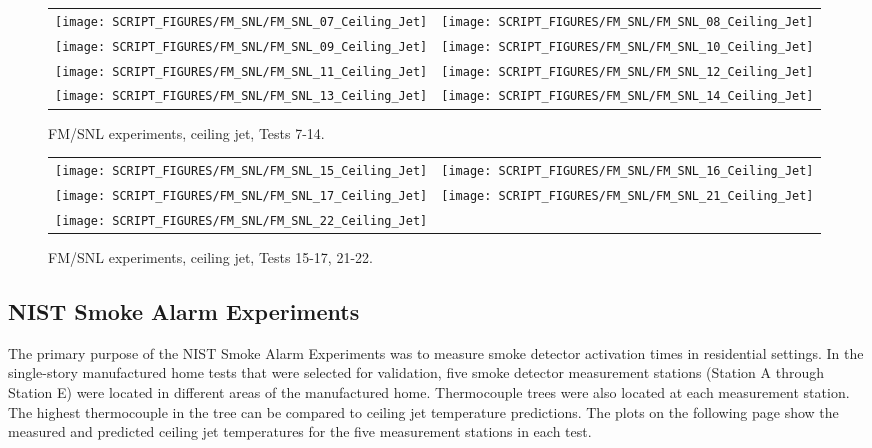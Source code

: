 \newpage

\begin{figure}[p]
\begin{tabular*}{\textwidth}{l@{\extracolsep{\fill}}r}
\texttt{[image: SCRIPT\_FIGURES/FM\_SNL/FM\_SNL\_07\_Ceiling\_Jet]} &
\texttt{[image: SCRIPT\_FIGURES/FM\_SNL/FM\_SNL\_08\_Ceiling\_Jet]} \\
\texttt{[image: SCRIPT\_FIGURES/FM\_SNL/FM\_SNL\_09\_Ceiling\_Jet]} &
\texttt{[image: SCRIPT\_FIGURES/FM\_SNL/FM\_SNL\_10\_Ceiling\_Jet]} \\
\texttt{[image: SCRIPT\_FIGURES/FM\_SNL/FM\_SNL\_11\_Ceiling\_Jet]} &
\texttt{[image: SCRIPT\_FIGURES/FM\_SNL/FM\_SNL\_12\_Ceiling\_Jet]} \\
\texttt{[image: SCRIPT\_FIGURES/FM\_SNL/FM\_SNL\_13\_Ceiling\_Jet]} &
\texttt{[image: SCRIPT\_FIGURES/FM\_SNL/FM\_SNL\_14\_Ceiling\_Jet]} \\
\end{tabular*}
\caption[FM/SNL experiments, ceiling jet, Tests 7-14]
{FM/SNL experiments, ceiling jet, Tests 7-14.}
\label{FM_SNL_Ceiling_Jet_2}
\end{figure}

\begin{figure}[p]
\begin{tabular*}{\textwidth}{l@{\extracolsep{\fill}}r}
\texttt{[image: SCRIPT\_FIGURES/FM\_SNL/FM\_SNL\_15\_Ceiling\_Jet]} &
\texttt{[image: SCRIPT\_FIGURES/FM\_SNL/FM\_SNL\_16\_Ceiling\_Jet]} \\
\texttt{[image: SCRIPT\_FIGURES/FM\_SNL/FM\_SNL\_17\_Ceiling\_Jet]} &
\texttt{[image: SCRIPT\_FIGURES/FM\_SNL/FM\_SNL\_21\_Ceiling\_Jet]} \\
\texttt{[image: SCRIPT\_FIGURES/FM\_SNL/FM\_SNL\_22\_Ceiling\_Jet]} \\
\end{tabular*}
\caption[FM/SNL experiments, ceiling jet, Tests 15-17, 21-22]
{FM/SNL experiments, ceiling jet, Tests 15-17, 21-22.}
\label{FM_SNL_Ceiling_Jet_3}
\end{figure}


\clearpage

\subsection{NIST Smoke Alarm Experiments}

The primary purpose of the NIST Smoke Alarm Experiments was to measure smoke detector activation times in residential settings. In the single-story manufactured home tests that were selected for validation, five smoke detector measurement stations (Station A through Station E) were located in different areas of the manufactured home. Thermocouple trees were also located at each measurement station. The highest thermocouple in the tree can be compared to ceiling jet temperature predictions. The plots on the following page show the measured and predicted ceiling jet temperatures for the five measurement stations in each test.

